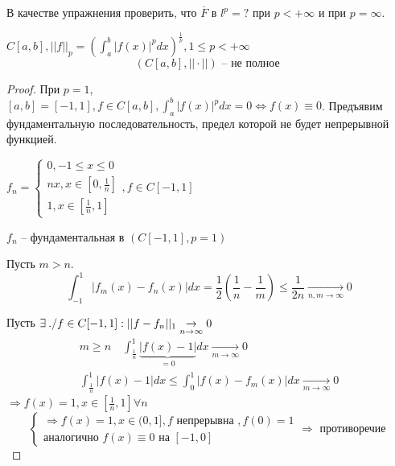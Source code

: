\documentclass[document]{subfiles}
\begin{document}
В качестве упражнения проверить, что $\overline{F}$ в $l^p = ? $ при $p < + \infty$ и при $p = \infty$.
\begin{theorem}
    $C[a,b], ||f||_p = \left( \int^b_a |f(x)|^p dx \right)^{\frac{1}{p}}, 1 \leq p < + \infty$
    \[ (C[a,b], || \cdot || ) \text { -- не полное } \]
\end{theorem}
\begin{proof}
    При $p = 1$, $[a,b] = [-1,1], f \in C[a,b], \int^b_a |f(x)|^p dx = 0 \Leftrightarrow f(x) \equiv 0$.
    Предъявим фундаментальную последовательность, предел которой не будет непрерывной функцией.

    $f_n = \begin{cases}
        0, -1 \leq x \leq 0 \\
        nx, x \in [0, \frac{1}{n}] \\
        1, x \in [\frac{1}{n}, 1]
    \end{cases}, f \in C[-1,1]$ %

    $f_n$ -- фундаментальная в $(C[-1,1], p=1)$

    Пусть $ m > n$. %
    \[ \int_{-1}^1 |f_m(x) - f_n(x)| dx = \frac{1}{2} \left( \frac{1}{n} - \frac{1}{m} \right) \leq \frac{1}{2n} \underset{n, m \to \infty}{\rightarrow} 0 \]

    Пусть $\exists ./ f \in C[-1,1] : \normunder{f-f_n}{1} \underset{n \to \infty}{\rightarrow} 0$ 
    \begin{gather*}
        m \geq n \quad \int^1_{\frac{1}{n}} \underbrace{|f(x) - 1|}_{=0} dx  \underset{m \to \infty}{\rightarrow} 0  \\
        \int^1_{\frac{1}{n}} {|f(x) - 1|} dx \leq \int^1_0 |f(x) - f_m(x)|dx \underset{m \to \infty}{\rightarrow} 0
    \end{gather*}
    $\Rightarrow f(x) = 1, x \in \left[ \frac{1}{n}, 1 \right] \forall n $\\
    \[ \begin{cases}
       \Rightarrow f(x) = 1, x \in (0,1], f \text{ непрерывна }, f(0) = 1\\
        \text{аналогично } f(x) \equiv 0 \text{ на } [-1,0]
    \end{cases} \Rightarrow \text{ противоречие } \]
\end{proof}
\end{document}
